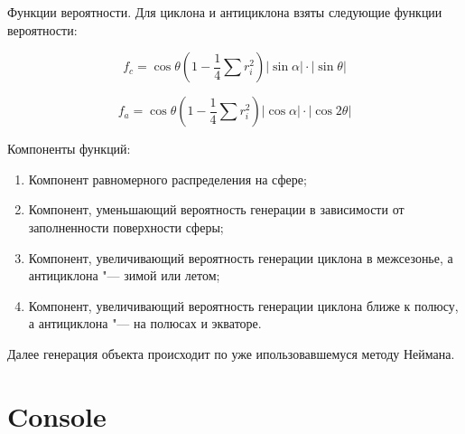 \documentclass[a4paper,12pt,fleqn]{article}
\begin{document}
Функции вероятности.
Для циклона и антициклона взяты следующие функции вероятности:

\[f_c = \cos \theta \left( 1 - \frac{1}{4} \sum r_i^2 \right ) | \sin \alpha | \cdot | \sin \theta |\]

\[f_a = \cos \theta \left( 1 - \frac{1}{4} \sum r_i^2 \right ) | \cos \alpha | \cdot | \cos 2 \theta |\]

Компоненты функций:

\begin{enumerate}
\item Компонент равномерного распределения на сфере;
\item Компонент, уменьшающий вероятность генерации в зависимости от заполненности поверхности сферы;
\item Компонент, увеличивающий вероятность генерации циклона в межсезонье, а антициклона "--- зимой или летом;
\item Компонент, увеличивающий вероятность генерации циклона ближе к полюсу, а антициклона "--- на полюсах и экваторе.                                                                                                                      \end{enumerate}

Далее генерация объекта происходит по уже ипользовавшемуся методу Неймана.

\section{Console}
\end{document}
